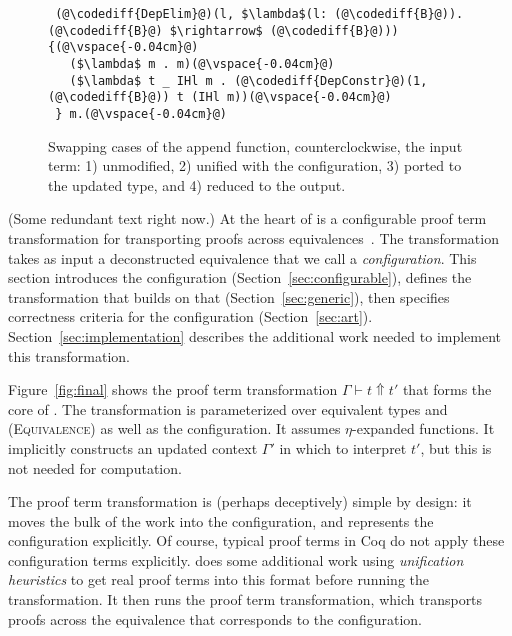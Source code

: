 \begin{figure*}
\begin{minipage}{0.49\textwidth}
\begin{lstlisting}
 (@\codediff{DepElim}@)(l, $\lambda$(l: (@\codediff{B}@)).(@\codediff{B}@) $\rightarrow$ (@\codediff{B}@))) {(@\vspace{-0.04cm}@)
   ($\lambda$ m . m)(@\vspace{-0.04cm}@)
   ($\lambda$ t _ IHl m . (@\codediff{DepConstr}@)(1, (@\codediff{B}@)) t (IHl m))(@\vspace{-0.04cm}@)
 } m.(@\vspace{-0.04cm}@)
\end{lstlisting}
\end{minipage}
\vspace{-0.3cm}
\caption{Swapping cases of the append function, counterclockwise, the input term: 1) unmodified, 2) unified with the configuration, 3) ported to the updated type, and 4) reduced to the output.}
\label{fig:appswap1}
\end{figure*}

(Some redundant text right now.)
At the heart of \toolnamec is a configurable proof term transformation for transporting
proofs across equivalences~\href{https://github.com/uwplse/pumpkin-pi/blob/v2.0.0/plugin/src/automation/lift/lift.ml}{}.
The transformation takes as input a deconstructed equivalence that we call a \textit{configuration}.
This section introduces the configuration (Section~\ref{sec:configurable}),
defines the transformation that builds on that (Section~\ref{sec:generic}),
then specifies correctness criteria for the configuration (Section~\ref{sec:art}).
Section~\ref{sec:implementation} describes the additional work needed to implement this transformation.

Figure~\ref{fig:final} shows the proof term transformation $\Gamma \vdash t \Uparrow t'$ that forms the core of \toolnamec.
The transformation is parameterized over equivalent types \Aa and \B (\textsc{Equivalence})
as well as the configuration.
It assumes $\eta$-expanded functions.
It implicitly constructs an updated context $\Gamma'$ in which to interpret $t'$, but this is not needed for computation.

The proof term transformation is (perhaps deceptively) simple by design:
it moves the bulk of the work into the configuration,
and represents the configuration explicitly.
Of course, typical proof terms in Coq do not apply these configuration
terms explicitly.
\toolnamec does some additional work using \textit{unification heuristics} to get real proof terms into this format before running the transformation.
It then runs the proof term transformation, which transports proofs across the equivalence that corresponds to the configuration.

